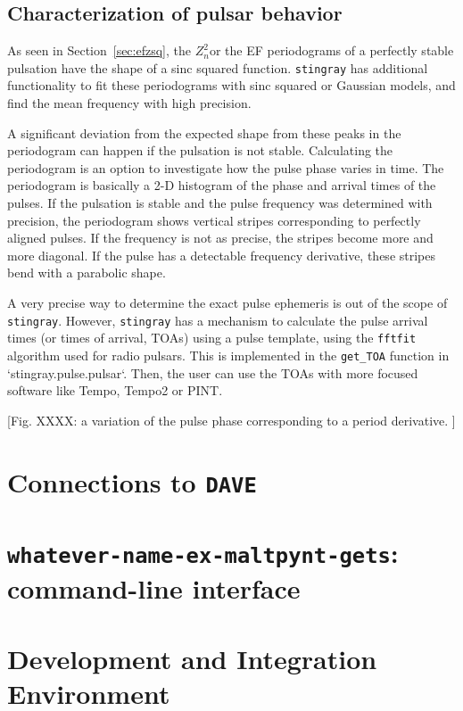 \documentclass[12pt]{emulateapj}
\newcommand{\zsq}{\ensuremath{Z^2_n}}
\newcommand{\stingray}{\texttt{stingray}\xspace}
\newcommand{\maltpynt}{\texttt{whatever-name-ex-maltpynt-gets}\xspace}
\begin{document}
\subsection{Characterization of pulsar behavior}
\label{sec:ephem}
As seen in Section~\ref{sec:efzsq}, the \zsq or the EF periodograms of a perfectly stable pulsation have the shape of a sinc squared function.
\stingray has additional functionality to fit these periodograms with sinc squared or Gaussian models, and find the mean frequency with high precision.

A significant deviation from the expected shape from these peaks in the periodogram can happen if the pulsation is not stable.
Calculating the periodogram is an option to investigate how the pulse phase varies in time.
The periodogram is basically a 2-D histogram of the phase and arrival times of the pulses. 
If the pulsation is stable and the pulse frequency was determined with precision, the periodogram shows vertical stripes corresponding to perfectly aligned pulses.
If the frequency is not as precise, the stripes become more and more diagonal.
If the pulse has a detectable frequency derivative, these stripes bend with a parabolic shape.

A very precise way to determine the exact pulse ephemeris is out of the scope of \stingray. 
However, \stingray has a mechanism to calculate the pulse arrival times (or times of arrival, TOAs) using a pulse template, using the \texttt{fftfit} algorithm used for radio pulsars. 
This is implemented in the \verb|get_TOA| function in `stingray.pulse.pulsar`.
Then, the user can use the TOAs with more focused software like Tempo, Tempo2 or PINT.

[Fig. XXXX: a variation of the pulse phase corresponding to a period derivative. ]

\section{Connections to \texttt{DAVE}}
\label{sec:dave}

\section{\maltpynt: command-line interface}
\label{sec:maltpynt}


\section{Development and Integration Environment}
\label{sec:development}
\end{document}

